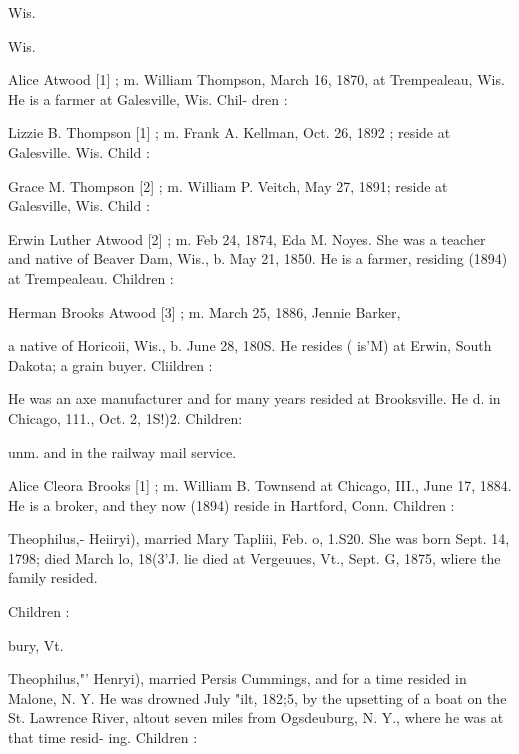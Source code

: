 \documentclass{book}
\begin{document}
Wis. 


Wis. 

Alice Atwood [1] ; m. William Thompson, March 16, 1870, at 
Trempealeau, Wis. He is a farmer at Galesville, Wis. Chil- 
dren : 










Lizzie B. Thompson [1] ; m. Frank A. Kellman, Oct. 26, 1892 ; 
reside at Galesville. Wis. Child : 

Grace M. Thompson [2] ; m. William P. Veitch, May 27, 1891; 
reside at Galesville, Wis. Child : 


Erwin Luther Atwood [2] ; m. Feb 24, 1874, Eda M. Noyes. 
She was a teacher and native of Beaver Dam, Wis., b. May 
21, 1850. He is a farmer, residing (1894) at Trempealeau. 
Children : 











Herman Brooks Atwood [3] ; m. March 25, 1886, Jennie Barker, 




a native of Horicoii, Wis., b. June 28, 180S. He resides ( is'M) 
at Erwin, South Dakota; a grain buyer. Cliildren : 




He was an axe manufacturer and for many years resided at 
Brooksville. He d. in Chicago, 111., Oct. 2, 1S!)2. Children: 



unm. and in the railway mail service. 

Alice Cleora Brooks [1] ; m. William B. Townsend at Chicago, 
III., June 17, 1884. He is a broker, and they now (1894) reside 
in Hartford, Conn. Children : 




Theophilus,- Heiiryi), married Mary Tapliii, Feb. o, 1.S20. She 
was born Sept. 14, 1798; died March lo, 18(3'J. lie died at 
Vergeuues, Vt., Sept. G, 1875, wliere the family resided. 

Children : 




bury, Vt. 




Theophilus,"' Henryi), married Persis Cummings, and for a time 
resided in Malone, N. Y. He was drowned July "ilt, 182;5, by 
the upsetting of a boat on the St. Lawrence River, altout seven 
miles from Ogsdeuburg, N. Y., where he was at that time resid- 
ing. Children : 
\end{document}

